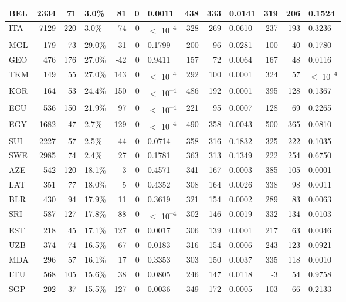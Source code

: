 \begin{tabular}{l|r|r|l|r|r|l|r|r|l|r|r|l}
\hline
BEL & 2334 & 71 & 3.0\% & 81 & 0 & 0.0011 & 438 & 333 & 0.0141 & 319 & 206 & 0.1524\\
\hline
ITA & 7129 & 220 & 3.0\% & 74 & 0 & $<$ 10\textsuperscript{--4} & 328 & 269 & 0.0610 & 237 & 193 & 0.3236\\
\hline
MGL & 179 & 73 & 29.0\% & 31 & 0 & 0.1799 & 200 & 96 & 0.0281 & 100 & 40 & 0.1780\\
\hline
GEO & 476 & 176 & 27.0\% & -42 & 0 & 0.9411 & 157 & 72 & 0.0064 & 167 & 48 & 0.0116\\
\hline
TKM & 149 & 55 & 27.0\% & 143 & 0 & $<$ 10\textsuperscript{--4} & 292 & 100 & 0.0001 & 324 & 57 & $<$ 10\textsuperscript{--4}\\
\hline
KOR & 164 & 53 & 24.4\% & 150 & 0 & $<$ 10\textsuperscript{--4} & 486 & 192 & 0.0001 & 395 & 128 & 0.1367\\
\hline
ECU & 536 & 150 & 21.9\% & 97 & 0 & $<$ 10\textsuperscript{--4} & 221 & 95 & 0.0007 & 128 & 69 & 0.2265\\
\hline
EGY & 1682 & 47 & 2.7\% & 129 & 0 & $<$ 10\textsuperscript{--4} & 490 & 358 & 0.0043 & 500 & 365 & 0.0810\\
\hline
SUI & 2227 & 57 & 2.5\% & 44 & 0 & 0.0714 & 358 & 316 & 0.1832 & 325 & 222 & 0.1035\\
\hline
SWE & 2985 & 74 & 2.4\% & 27 & 0 & 0.1781 & 363 & 313 & 0.1349 & 222 & 254 & 0.6750\\
\hline
AZE & 542 & 120 & 18.1\% & 3 & 0 & 0.4571 & 341 & 167 & 0.0003 & 385 & 105 & 0.0001\\
\hline
LAT & 351 & 77 & 18.0\% & 5 & 0 & 0.4352 & 308 & 164 & 0.0026 & 338 & 98 & 0.0011\\
\hline
BLR & 430 & 94 & 17.9\% & 11 & 0 & 0.3619 & 321 & 154 & 0.0002 & 289 & 83 & 0.0063\\
\hline
SRI & 587 & 127 & 17.8\% & 88 & 0 & $<$ 10\textsuperscript{--4} & 302 & 146 & 0.0019 & 332 & 134 & 0.0103\\
\hline
EST & 218 & 45 & 17.1\% & 127 & 0 & 0.0017 & 306 & 139 & 0.0001 & 217 & 63 & 0.0046\\
\hline
UZB & 374 & 74 & 16.5\% & 67 & 0 & 0.0183 & 316 & 154 & 0.0006 & 243 & 123 & 0.0921\\
\hline
MDA & 296 & 57 & 16.1\% & 17 & 0 & 0.3353 & 303 & 150 & 0.0037 & 335 & 118 & 0.0010\\
\hline
LTU & 568 & 105 & 15.6\% & 38 & 0 & 0.0805 & 246 & 147 & 0.0118 & -3 & 54 & 0.9758\\
\hline
SGP & 202 & 37 & 15.5\% & 127 & 0 & 0.0036 & 349 & 172 & 0.0005 & 103 & 66 & 0.2133\\

\end{tabular}
